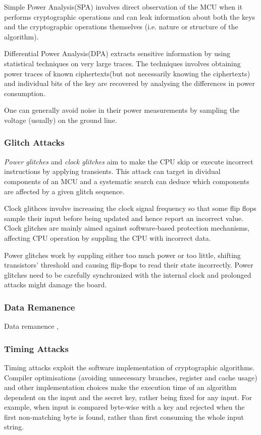 \documentclass[10pt,journal,compsoc]{IEEEtran}
\begin{document}
	Simple Power Analysis(SPA) involves direct observation of the MCU when it performs cryptographic operations and can leak information about both the keys and the cryptographic operations themselves (i.e. nature or structure of the algorithm). 

	Differential Power Analysis(DPA) extracts sensitive information by using statistical techniques on very large traces. The techniques involves obtaining power traces of known ciphertexts(but not necessarily knowing the ciphertexts) and individual bits of the key are recovered by analysing the differences in power consumption\citep{kocher:DPA}.
	
	One can generally avoid noise in their power measurements by sampling the voltage (usually) on the ground line.
	\subsubsection{Glitch Attacks}
	\emph{Power glitches} and \emph{clock glitches} aim to make the CPU skip or execute incorrect instructions by applying transients. This attack can target in dividual components of an MCU and a systematic search can deduce which components are affected by a given glitch sequence.
	
	Clock glithces involve increasing the clock signal frequency so that some flip flops sample their input before being updated and hence report an incorrect value. Clock glitches are mainly aimed against software-based protection mechanisms, affecting CPU operation by suppling the CPU with incorrect data.
	
	Power glitches work by suppling either too much power or too little, shifting transistors' threshold and causing flip-flops to read their state incorrectly. Power glitches need to be carefully synchronized with the internal clock and prolonged attacks might damage the board.
	
	\subsubsection{Data Remanence}
	Data remanence \citep{anderson:tamper_resistance}\citep{gutman:memory_remanence},
	\subsubsection{Timing Attacks}
	Timing attacks exploit the software implementation of cryptographic algorithms. Compiler optimisations (avoiding unnecessary branches, register and cache usage) and other implementation choices make the execution time of an algorithm dependent on the input and the secret key, rather being fixed for any input. For example, when input is compared byte-wise with a key and rejected when the first non-matching byte is found, rather than first consuming the whole input string.
	
\end{document}
